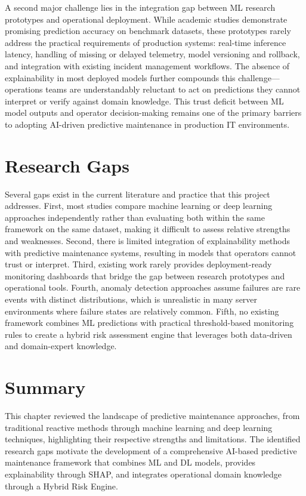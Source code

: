 \documentclass[12pt,letterpaper]{report}
\begin{document}
A second major challenge lies in the integration gap between ML research prototypes and operational deployment. While academic studies demonstrate promising prediction accuracy on benchmark datasets, these prototypes rarely address the practical requirements of production systems: real-time inference latency, handling of missing or delayed telemetry, model versioning and rollback, and integration with existing incident management workflows. The absence of explainability in most deployed models further compounds this challenge---operations teams are understandably reluctant to act on predictions they cannot interpret or verify against domain knowledge. This trust deficit between ML model outputs and operator decision-making remains one of the primary barriers to adopting AI-driven predictive maintenance in production IT environments.

\section{Research Gaps}

Several gaps exist in the current literature and practice that this project addresses. First, most studies compare machine learning or deep learning approaches independently rather than evaluating both within the same framework on the same dataset, making it difficult to assess relative strengths and weaknesses. Second, there is limited integration of explainability methods with predictive maintenance systems, resulting in models that operators cannot trust or interpret. Third, existing work rarely provides deployment-ready monitoring dashboards that bridge the gap between research prototypes and operational tools. Fourth, anomaly detection approaches assume failures are rare events with distinct distributions, which is unrealistic in many server environments where failure states are relatively common. Fifth, no existing framework combines ML predictions with practical threshold-based monitoring rules to create a hybrid risk assessment engine that leverages both data-driven and domain-expert knowledge.

\section{Summary}

This chapter reviewed the landscape of predictive maintenance approaches, from traditional reactive methods through machine learning and deep learning techniques, highlighting their respective strengths and limitations. The identified research gaps motivate the development of a comprehensive AI-based predictive maintenance framework that combines ML and DL models, provides explainability through SHAP, and integrates operational domain knowledge through a Hybrid Risk Engine.
\end{document}
